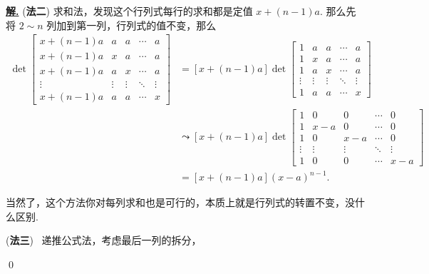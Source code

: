 \documentclass[10pt,openany]{article}
\theoremstyle{thmstyle} %
\theoremstyle{defstyle} %
\theoremstyle{prostyle} %
\theoremstyle{exastyle}
\theoremstyle{remstyle}
\newenvironment{solution}{\par\underline{\textbf{解.}} \;\fangsong}{\qed\par}
\begin{document}
\begin{solution}
	(\textbf{法二}) 求和法，发现这个行列式每行的求和都是定值 \( x+(n-1)a \). 那么先将 \( 2 \sim n \) 列加到第一列，行列式的值不变，那么
	\begin{align*}
		\det \begin{bmatrix}
			x+(n-1)a & a & a & \cdots & a \\
			x+(n-1)a & x & a & \cdots & a \\
			x+(n-1)a & a & x & \cdots & a \\
			\vdots & \vdots & \vdots & \ddots & \vdots \\
			x+(n-1)a & a & a & \cdots & x
		\end{bmatrix} &=[x+(n-1)a] \det \begin{bmatrix}
			1 & a & a & \cdots & a \\
			1 & x & a & \cdots & a \\
			1 & a & x & \cdots & a \\
			\vdots & \vdots & \vdots & \ddots & \vdots \\
			1 & a & a & \cdots & x
		\end{bmatrix} \\
		& \leadsto [x+(n-1)a] \det \begin{bmatrix}
			1 & 0 & 0 & \cdots & 0 \\
			1 & x-a & 0 & \cdots & 0 \\
			1 & 0 & x-a & \cdots & 0 \\
			\vdots & \vdots & \vdots & \ddots & \vdots \\
			1 & 0 & 0 & \cdots & x-a
		\end{bmatrix} \\
		&= [x+(n-1)a](x-a)^{n-1}.
	\end{align*}
	
	当然了，这个方法你对每列求和也是可行的，本质上就是行列式的转置不变，没什么区别.
	
    \vspace{1ex}
    
    (\textbf{法三}) \ 递推公式法，考虑最后一列的拆分，
    

\end{solution}
\end{document}
